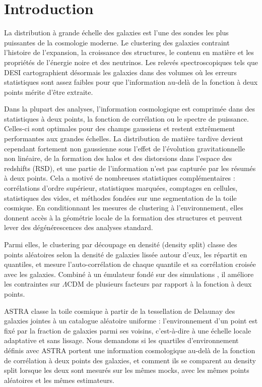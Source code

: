\documentclass[11pt,twocolumn]{article}
\begin{document}
\section{Introduction}

La distribution à grande échelle des galaxies est l'une des sondes les plus puissantes de la cosmologie moderne. Le clustering des galaxies contraint l'histoire de l'expansion, la croissance des structures, le contenu en matière et les propriétés de l'énergie noire et des neutrinos. Les relevés spectroscopiques tels que DESI cartographient désormais les galaxies dans des volumes où les erreurs statistiques sont assez faibles pour que l'information au-delà de la fonction à deux points mérite d'être extraite.

Dans la plupart des analyses, l'information cosmologique est comprimée dans des statistiques à deux points, la fonction de corrélation ou le spectre de puissance. Celles-ci sont optimales pour des champs gaussiens et restent extrêmement performantes aux grandes échelles. La distribution de matière tardive devient cependant fortement non gaussienne sous l'effet de l'évolution gravitationnelle non linéaire, de la formation des halos et des distorsions dans l'espace des redshifts (RSD), et une partie de l'information n'est pas capturée par les résumés à deux points. Cela a motivé de nombreuses statistiques complémentaires : corrélations d'ordre supérieur, statistiques marquées, comptages en cellules, statistiques des vides, et méthodes fondées sur une segmentation de la toile cosmique. En conditionnant les mesures de clustering à l'environnement, elles donnent accès à la géométrie locale de la formation des structures et peuvent lever des dégénérescences des analyses standard.

Parmi elles, le clustering par découpage en densité (density split) \cite{Paillas2023, Paillas2024} classe des points aléatoires selon la densité de galaxies lissée autour d'eux, les répartit en quantiles, et mesure l'auto-corrélation de chaque quantile et sa corrélation croisée avec les galaxies. Combiné à un émulateur fondé sur des simulations \cite{CuestaLazaro2024}, il améliore les contraintes sur $\Lambda$CDM de plusieurs facteurs par rapport à la fonction à deux points.

ASTRA \cite{ASTRA} classe la toile cosmique à partir de la tessellation de Delaunay des galaxies jointes à un catalogue aléatoire uniforme : l'environnement d'un point est fixé par la fraction de galaxies parmi ses voisins, c'est-à-dire à une échelle locale adaptative et sans lissage. Nous demandons si les quartiles d'environnement définis avec ASTRA portent une information cosmologique au-delà de la fonction de corrélation à deux points des galaxies, et comment ils se comparent au density split lorsque les deux sont mesurés sur les mêmes mocks, avec les mêmes points aléatoires et les mêmes estimateurs.
\end{document}
